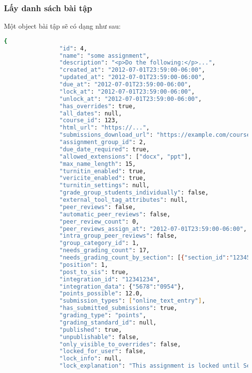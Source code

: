 \documentclass[../Thesis.tex]{subfiles}
\begin{document}
            \subsubsection{Lấy danh sách bài tập}
                Một object bài tập sẽ có dạng như sau:
                \begin{lstlisting}[language=bash]
                {
                "id": 4,
                "name": "some assignment",
                "description": "<p>Do the following:</p>...",
                "created_at": "2012-07-01T23:59:00-06:00",
                "updated_at": "2012-07-01T23:59:00-06:00",
                "due_at": "2012-07-01T23:59:00-06:00",
                "lock_at": "2012-07-01T23:59:00-06:00",
                "unlock_at": "2012-07-01T23:59:00-06:00",
                "has_overrides": true,
                "all_dates": null,
                "course_id": 123,
                "html_url": "https://...",
                "submissions_download_url": "https://example.com/courses/:course_id/assignments/:id/submissions?zip=1",
                "assignment_group_id": 2,
                "due_date_required": true,
                "allowed_extensions": ["docx", "ppt"],
                "max_name_length": 15,
                "turnitin_enabled": true,
                "vericite_enabled": true,
                "turnitin_settings": null,
                "grade_group_students_individually": false,
                "external_tool_tag_attributes": null,
                "peer_reviews": false,
                "automatic_peer_reviews": false,
                "peer_review_count": 0,
                "peer_reviews_assign_at": "2012-07-01T23:59:00-06:00",
                "intra_group_peer_reviews": false,
                "group_category_id": 1,
                "needs_grading_count": 17,
                "needs_grading_count_by_section": [{"section_id":"123456","needs_grading_count":5}, {"section_id":"654321","needs_grading_count":0}],
                "position": 1,
                "post_to_sis": true,
                "integration_id": "12341234",
                "integration_data": {"5678":"0954"},
                "points_possible": 12.0,
                "submission_types": ["online_text_entry"],
                "has_submitted_submissions": true,
                "grading_type": "points",
                "grading_standard_id": null,
                "published": true,
                "unpublishable": false,
                "only_visible_to_overrides": false,
                "locked_for_user": false,
                "lock_info": null,
                "lock_explanation": "This assignment is locked until September 1 at 12:00am",

\end{lstlisting}
\end{document}
